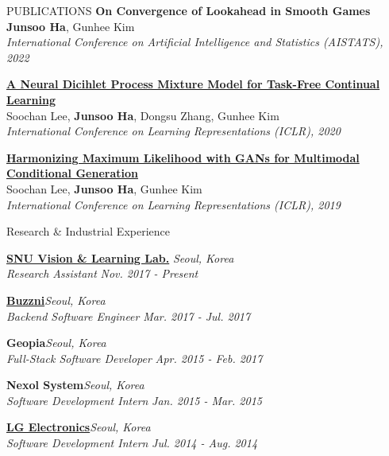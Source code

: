 \documentclass{resume} %
\begin{document}
\begin{rSection}{PUBLICATIONS}
	{\bf On Convergence of Lookahead in Smooth Games} \\
	{\bf Junsoo Ha}, Gunhee Kim \\
	{\em International Conference on Artificial Intelligence and Statistics (AISTATS), 2022}
	
	{\bf \href{https://openreview.net/forum?id=SJxSOJStPr}{A Neural Dicihlet Process Mixture Model for Task-Free Continual Learning}} \\ 
	Soochan Lee, {\bf Junsoo Ha}, Dongsu Zhang, Gunhee Kim \\
	{\em International Conference on Learning Representations (ICLR), 2020}
	
	
	{\bf \href{https://openreview.net/forum?id=HJxyAjRcFX}{Harmonizing Maximum Likelihood with GANs for Multimodal Conditional Generation}} \\ 
	Soochan Lee, {\bf Junsoo Ha}, Gunhee Kim \\
	{\em International Conference on Learning Representations (ICLR), 2019}
\end{rSection}


\begin{rSection}{Research \& Industrial Experience}

{\bf \href{https://vision.snu.ac.kr/}{SNU Vision \& Learning Lab.}} \hfill{\em Seoul, Korea} \\
\textit{Research Assistant} \hfill{\em Nov. 2017 - Present}

{\bf \href{https://www.buzzni.com/}{Buzzni}}\hfill{\em Seoul, Korea} \\
\textit{Backend Software Engineer} \hfill{\em Mar. 2017 - Jul. 2017}

{\bf Geopia}\hfill{\em Seoul, Korea}\\
\textit{Full-Stack Software Developer} \hfill{\em Apr. 2015 - Feb. 2017}

{\bf Nexol System}\hfill{\em Seoul, Korea}\\
\textit{Software Development Intern} \hfill{\em Jan. 2015 - Mar. 2015}

{\bf \href{https://www.lg.com/us}{LG Electronics}}\hfill{\em Seoul, Korea}\\
\textit{Software Development Intern} \hfill{\em Jul. 2014 - Aug. 2014}

\end{rSection}
\end{document}
